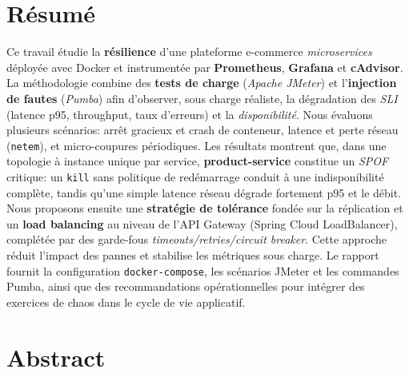 \documentclass[a4paper,12pt,twoside]{report}
\begin{document}
\chapter*{Résumé}

Ce travail étudie la \textbf{résilience} d'une plateforme e-commerce \textit{microservices} déployée avec Docker et instrumentée par \textbf{Prometheus}, \textbf{Grafana} et \textbf{cAdvisor}. 
La méthodologie combine des \textbf{tests de charge} (\textit{Apache JMeter}) et l'\textbf{injection de fautes} (\textit{Pumba}) afin d'observer, sous charge réaliste, la dégradation des \textit{SLI} (latence p95, throughput, taux d'erreurs) et la \textit{disponibilité}. 
Nous évaluons plusieurs scénarios: arrêt gracieux et crash de conteneur, latence et perte réseau (\texttt{netem}), et micro-coupures périodiques. 
Les résultats montrent que, dans une topologie à instance unique par service, \textbf{product-service} constitue un \textit{SPOF} critique: un \texttt{kill} sans politique de redémarrage conduit à une indisponibilité complète, tandis qu'une simple latence réseau dégrade fortement p95 et le débit. 
Nous proposons ensuite une \textbf{stratégie de tolérance} fondée sur la réplication et un \textbf{load balancing} au niveau de l'API Gateway (Spring Cloud LoadBalancer), complétée par des garde-fous \textit{timeouts/retries/circuit breaker}. 
Cette approche réduit l'impact des pannes et stabilise les métriques sous charge. 
Le rapport fournit la configuration \texttt{docker-compose}, les scénarios JMeter et les commandes Pumba, ainsi que des recommandations opérationnelles pour intégrer des exercices de chaos dans le cycle de vie applicatif.


\chapter*{Abstract}
\end{document}

